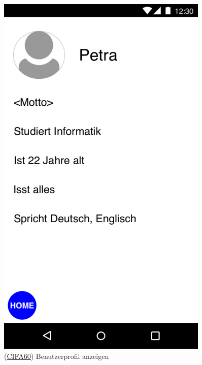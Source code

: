 \documentclass[a4paper]{scrreprt}
\begin{document}
\begin{figure}[H]
	\centering
	\begin{minipage}[b]{0.48\textwidth}
		\centering
		\includegraphics[width=0.9\textwidth]{res/GUI/05.jpeg}
		\label{Fig.5}
		(\hyperlink{cifa60}{CIFA60}) Benutzerprofil anzeigen
	\end{minipage}
	\begin{minipage}[b]{0.48\textwidth}
		\centering

\end{minipage}
\end{figure}
\end{document}
